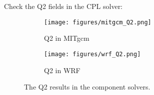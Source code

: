 
Check the Q2 fields in the CPL solver:

\begin{figure}[h!]
\centering
  \begin{subfigure}[b]{0.4\linewidth}
  \texttt{[image: figures/mitgcm\_Q2.png]}
  \caption{Q2 in MITgcm}
  \end{subfigure}
  \begin{subfigure}[b]{0.4\linewidth}
  \texttt{[image: figures/wrf\_Q2.png]}
  \caption{Q2 in WRF}
  \end{subfigure}
\caption{The Q2 results in the component solvers.}
\label{fig:q2}
\end{figure}
